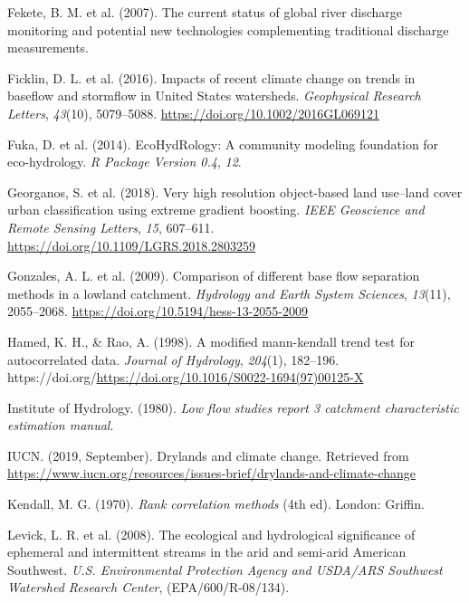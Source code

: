 \documentclass[
]{agujournal2019}
\newlength{\cslhangindent}
\newenvironment{CSLReferences}[2] %
 {\begin{list}{}{%
  \setlength{\itemindent}{0pt}
  \setlength{\leftmargin}{0pt}
  \setlength{\parsep}{0pt}
  \ifodd #1
   \setlength{\leftmargin}{\cslhangindent}
   \setlength{\itemindent}{-1\cslhangindent}
  \fi
  \setlength{\itemsep}{#2\baselineskip}}}
 {\end{list}}
\begin{document}
\begin{CSLReferences}{1}{0}
Fekete, B. M. et al. (2007). The current status of global river
discharge monitoring and potential new technologies complementing
traditional discharge measurements.

Ficklin, D. L. et al. (2016). Impacts of recent climate change on trends
in baseflow and stormflow in United States watersheds. \emph{Geophysical
Research Letters}, \emph{43}(10), 5079--5088.
\url{https://doi.org/10.1002/2016GL069121}

Fuka, D. et al. (2014). EcoHydRology: A community modeling foundation
for eco-hydrology. \emph{R Package Version 0.4}, \emph{12}.

Georganos, S. et al. (2018). Very high resolution object-based land
use--land cover urban classification using extreme gradient boosting.
\emph{IEEE Geoscience and Remote Sensing Letters}, \emph{15}, 607--611.
\url{https://doi.org/10.1109/LGRS.2018.2803259}

Gonzales, A. L. et al. (2009). Comparison of different base flow
separation methods in a lowland catchment. \emph{Hydrology and Earth
System Sciences}, \emph{13}(11), 2055--2068.
\url{https://doi.org/10.5194/hess-13-2055-2009}

Hamed, K. H., \& Rao, A. (1998). A modified mann-kendall trend test for
autocorrelated data. \emph{Journal of Hydrology}, \emph{204}(1),
182--196.
https://doi.org/\url{https://doi.org/10.1016/S0022-1694(97)00125-X}

Institute of Hydrology. (1980). \emph{Low flow studies report 3
catchment characteristic estimation manual}.

IUCN. (2019, September). Drylands and climate change. Retrieved from
\url{https://www.iucn.org/resources/issues-brief/drylands-and-climate-change}

Kendall, M. G. (1970). \emph{Rank correlation methods} (4th ed). London:
Griffin.

Levick, L. R. et al. (2008). {The ecological and hydrological
significance of ephemeral and intermittent streams in the arid and
semi-arid American Southwest}. \emph{U.S. Environmental Protection
Agency and USDA/ARS Southwest Watershed Research Center},
(EPA/600/R-08/134).


\end{CSLReferences}
\end{document}
